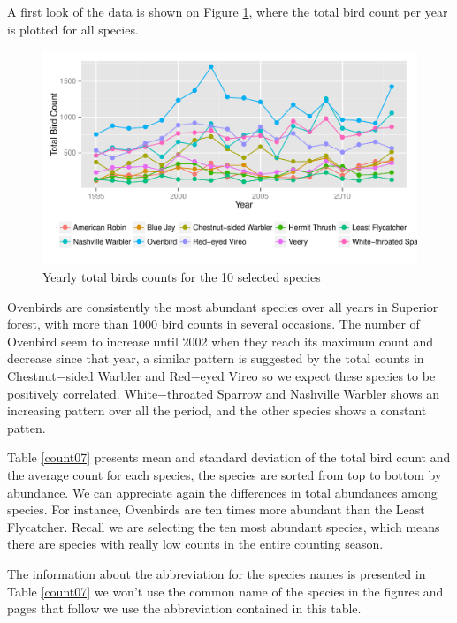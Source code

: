 \documentclass{article}
\begin{document}
A first look of the data is shown on Figure \ref{figtr}, where the total bird count per year is plotted for all species. 
\begin{figure}[hbpt]
\centering
\includegraphics[width =\textwidth]{rawtrend}
 \vspace{-.5in}
\caption{Yearly total birds counts for the 10 selected species \label{figtr} }
\end{figure}

Ovenbirds are consistently the most abundant species over all years in Superior forest,  with more than 1000 bird counts in several occasions. The number of Ovenbird seem to increase until 2002 when they reach its maximum count and decrease since that year, a similar pattern is suggested by the total counts in Chestnut−sided Warbler and Red−eyed Vireo so we expect these species to be positively correlated.  White−throated Sparrow and Nashville Warbler shows an increasing pattern over all the period, and the other species shows a constant patten.  

Table \ref{count07} presents  mean and standard deviation  of the total bird count and the average count for each species, the species are sorted from top to bottom by abundance.  We can appreciate again the differences in total abundances among species. For instance, Ovenbirds are ten times more abundant than the Least Flycatcher. Recall we are selecting the ten most abundant species, which means there are species with really low counts in the entire counting season. 



The information about the abbreviation for the species names is presented in Table \ref{count07} we won't use the common name of the species in the figures and pages that follow we use the abbreviation contained in this table. 
\end{document}
